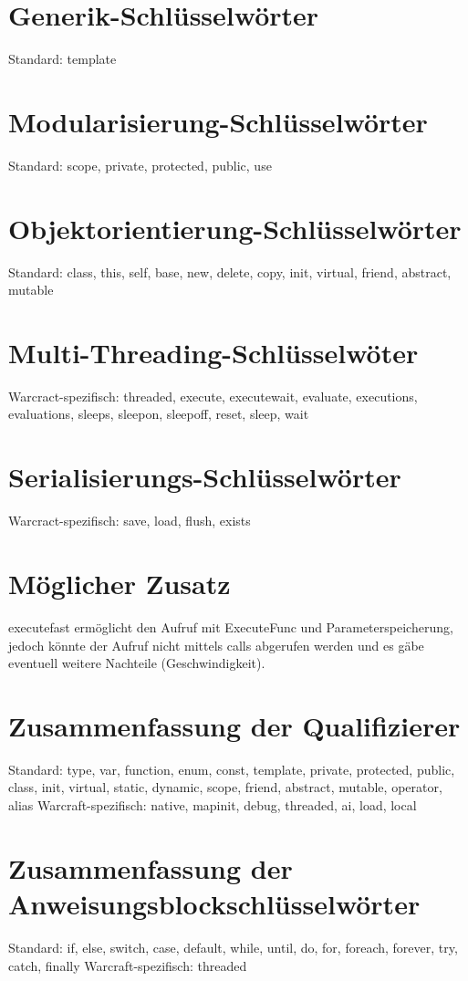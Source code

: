 \section{Generik-Schlüsselwörter}
Standard: template

\section{Modularisierung-Schlüsselwörter}
Standard: scope, private, protected, public, use

\section{Objektorientierung-Schlüsselwörter}
Standard: class, this, self, base, new, delete, copy, init, virtual, friend, abstract, mutable

\section{Multi-Threading-Schlüsselwöter}
Warcract-spezifisch: threaded, execute, executewait, evaluate, executions, evaluations, sleeps, sleepon, sleepoff, reset, sleep, wait

\section{Serialisierungs-Schlüsselwörter}
Warcract-spezifisch: save, load, flush, exists

\section{Möglicher Zusatz}
executefast ermöglicht den Aufruf mit ExecuteFunc und Parameterspeicherung, jedoch könnte
der Aufruf nicht mittels calls abgerufen werden und es gäbe eventuell weitere Nachteile
(Geschwindigkeit).

\section{Zusammenfassung der Qualifizierer}
Standard: type, var, function, enum, const, template, private, protected, public, class, init, virtual, static, dynamic, scope, friend, abstract, mutable, operator, alias
Warcraft-spezifisch: native, mapinit, debug, threaded, ai, load, local

\section{Zusammenfassung der Anweisungsblockschlüsselwörter}
Standard: if, else, switch, case, default, while, until, do, for, foreach, forever, try, catch, finally
Warcraft-spezifisch: threaded

